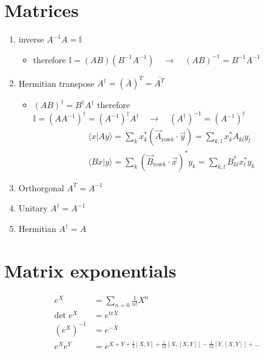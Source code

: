 \documentclass[10pt,a4paper]{book}
\theoremstyle{definition}
\begin{document}
\begin{center}
\end{center}


\section{Matrices}
\begin{enumerate}
    \item inverse $A^{-1}A=\mathbb{I}$
    \begin{itemize}
        \item therefore $\mathbb{I}=(AB)(B^{-1}A^{-1})\quad\rightarrow\quad (AB)^{-1}=B^{-1}A^{-1}$
    \end{itemize}
    \item Hermitian transpose $A^\dagger = (\overline{A})^T = \overline{A^T}$
        \begin{itemize}
        \item $(AB)^\dagger=B^\dagger A^\dagger$ therefore $\mathbb{I}=(AA^{-1})^\dagger=(A^{-1})^\dagger A^\dagger\quad\rightarrow\quad (A^\dagger)^{-1}=(A^{-1})^\dagger$
        \begin{align}
        \langle x |A y\rangle=\sum_k x_k^* (\vec{A}_{\text{row}k}\cdot\vec{y})=\sum_{k,l} x_k^* A_{kl}y_l\\
        \langle Bx |y\rangle = \sum_k(\vec{B}_{\text{row}k}\cdot \vec{x})^*y_k= \sum_{k,l}B_{kl}^*x_l^*y_k
        \end{align}
    \end{itemize}
    \item Orthorgonal $A^T = A^{-1}$
    \item Unitary $A^\dagger = A^{-1}$
    \item Hermitian $A^\dagger = A$
\end{enumerate}

\section{Matrix exponentials}
\begin{align}
e^X&=\sum_{n=0}\frac{1}{n!}X^n\\
\text{det}\;e^X&=e^{\text{tr} X} \\
\left(e^X\right)^{-1}&=e^{-X}\\
e^Xe^Y&=e^{X+Y+\frac{1}{2}[X,Y]+\frac{1}{12}[X,[X,Y]]-\frac{1}{12}[Y,[X,Y]]+...}
\end{align}
\end{document}
